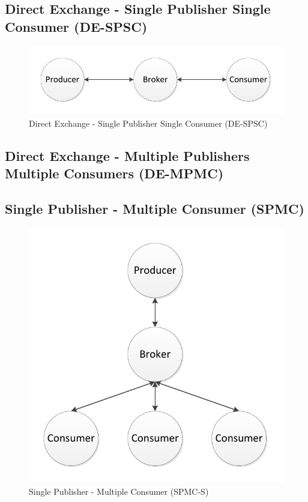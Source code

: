 \documentclass{thesis}
\begin{document}
\subsection{Direct Exchange - Single Publisher Single Consumer (DE-SPSC)}

\begin{figure}
\centering
\vspace{2.0in} 
\includegraphics{direct_connect}  
\caption{Direct Exchange - Single Publisher Single Consumer (DE-SPSC)}
\label{Figure 2}  
\end{figure}

\subsection{Direct Exchange - Multiple Publishers Multiple Consumers (DE-MPMC)}

\subsection{Single Publisher - Multiple Consumer (SPMC)}

\begin{figure}
\centering
\vspace{2.0in} 
\includegraphics{simple_fanout}  
\caption{Single Publisher - Multiple Consumer (SPMC-S)}
\label{Figure 3}  
\end{figure}
\end{document}
